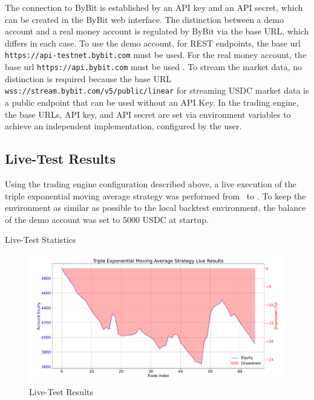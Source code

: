 \noindent
The connection to ByBit is established by an API key and an API secret, which can be created in the ByBit web interface.
The distinction between a demo account and a real money account is regulated by ByBit via the base URL, which differs in each case.
To use the demo account, for REST endpoints, the base url \texttt{https://api-testnet.bybit.com} must be used.
For the real money account, the base url \texttt{https://api.bybit.com} must be used \cite{integration}.
To stream the market data, no distinction is required because the base URL \texttt{wss://stream.bybit.com/v5/public/linear} \cite{ws-connect} for streaming USDC market data is a public endpoint that can be used without an API Key.
In the trading engine, the base URLs, API key, and API secret are set via environment variables to achieve an independent implementation, configured by the user.

\subsection{Live-Test Results}

Using the trading engine configuration described above, a live execution of the triple exponential moving average strategy was performed from \liveStartDataStartDate~to \liveStartDataEndDate.
To keep the environment as similar as possible to the local backtest environment, the balance of the demo account was set to 5000 USDC at startup.

\begin{table}
    \centering
    
    \caption{Live-Test Statistics}
    \label{tbl:live-results}
\end{table}

\begin{figure}[H]
    \centering
    \includegraphics[width=\textwidth]{images/live/live-result}
    \caption{Live-Test Results}
    \label{fig:live-results}
\end{figure}

